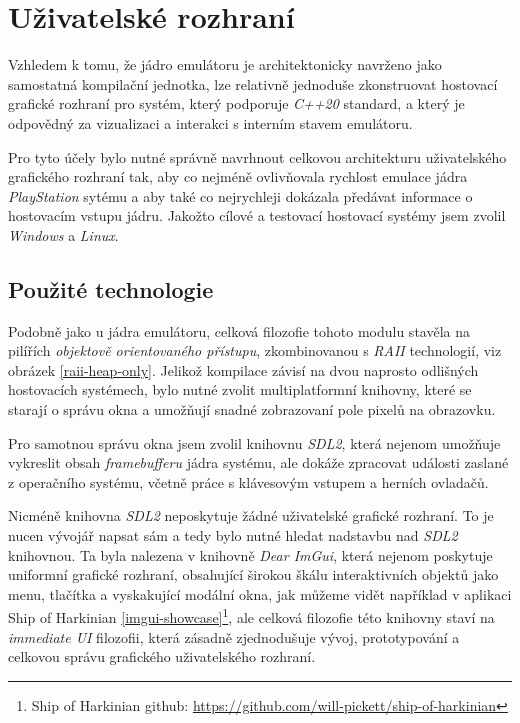 \chapter{Uživatelské rozhraní}

Vzhledem k tomu, že jádro emulátoru je architektonicky navrženo jako samostatná kompilační jednotka,
lze relativně jednoduše zkonstruovat hostovací grafické rozhraní pro systém, který podporuje \textit{C++20} standard, 
a který je odpovědný za vizualizaci a interakci s interním stavem emulátoru. 

Pro tyto účely bylo nutné správně navrhnout celkovou architekturu uživatelského grafického rozhraní tak, aby
co nejméně ovlivňovala rychlost emulace jádra \textit{PlayStation} sytému a aby také co nejrychleji
dokázala předávat informace o hostovacím vstupu jádru.
Jakožto cílové a testovací hostovací systémy jsem zvolil \textit{Windows} a \textit{Linux}.

\section{Použité technologie}

Podobně jako u jádra emulátoru, celková filozofie tohoto modulu stavěla na pilířích \textit{objektově orientovaného přístupu}, 
zkombinovanou s \textit{RAII} technologií, viz obrázek \ref{raii-heap-only}. Jelikož kompilace závisí na dvou naprosto odlišných
hostovacích systémech, bylo nutné zvolit multiplatformní knihovny, které se starají o správu okna a umožňují snadné
zobrazovaní pole pixelů na obrazovku.

Pro samotnou správu okna jsem zvolil knihovnu \textit{SDL2}, která nejenom umožňuje vykreslit obsah \textit{framebufferu} jádra systému,
ale dokáže zpracovat události zaslané z operačního systému, včetně práce s klávesovým vstupem a herních ovladačů.

Nicméně knihovna \textit{SDL2} neposkytuje žádné uživatelské grafické rozhraní. To je nucen vývojář napsat sám a tedy
bylo nutné hledat nadstavbu nad \textit{SDL2} knihovnou. Ta byla nalezena v knihovně \textit{Dear ImGui}, která nejenom
poskytuje uniformní grafické rozhraní, obsahující širokou škálu interaktivních objektů jako menu, tlačítka a vyskakující modální okna, jak můžeme vidět například v aplikaci Ship of Harkinian \ref{imgui-showcase}\footnote{Ship of Harkinian github: \url{https://github.com/will-pickett/ship-of-harkinian}},
ale celková filozofie této knihovny staví na \textit{immediate UI} filozofii, která zásadně zjednodušuje vývoj, prototypování a celkovou
správu grafického uživatelského rozhraní.

